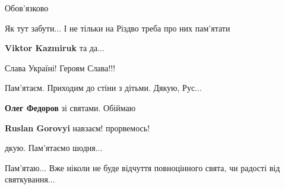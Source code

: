  
 
 
 
 
\zzSecCmt

\begin{itemize} %
Обов’язково

Як тут забути...
І не тільки на Різдво треба про них пам'ятати

\textbf{Viktor Kazmiruk} та да...

Слава Україні! Героям Слава!!!

Пам'ятаєм.
Приходим до стіни з дітьми. Дякую, Рус...

\textbf{Олег Федоров} зі святами. Обіймаю

\textbf{Ruslan Gorovyi} навзаєм! прорвемось!

дкую. Пам'ятаємо шодня...

Пам'ятаю... Вже ніколи не буде відчуття повноцінного свята, чи радості від святкування...


\end{itemize} %
